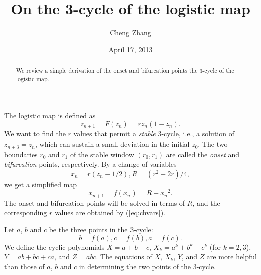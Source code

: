 \documentclass[twocolumn,prl]{revtex4-1}
\begin{document}
\title{On the 3-cycle of the logistic map}
\author{Cheng Zhang}
\date{April 17, 2013}

\begin{abstract}
We review a simple derivation of
  the onset and bifurcation points the 3-cycle
  of the logistic map.
\end{abstract}
\maketitle


The logistic map is defined as
\[
  z_{n+1} = F(z_n) = r z_n (1 - z_n).
\]
We want to find the $r$ values that permit a \emph{stable} 3-cycle,
i.e., a solution of $z_{n+3} = z_n$,
which can sustain a small deviation in the initial $z_0$.
The two boundaries $r_0$ and $r_1$
  of the stable window $(r_0, r_1)$
  are called the \emph{onset} and \emph{bifurcation} points, respectively.
%
By a change of variables
\begin{equation}
  x_n = r (z_n - 1/2),
  R = (r^2 - 2 r)/4,
\label{eq:chvars}
\end{equation}
we get a simplified map
\[
x_{n+1} = f(x_n) = R - {x_n}^2.
\]
The onset and bifurcation points will be solved
  in terms of $R$, and the corresponding $r$ values
  are obtained by (\ref{eq:chvars}).


Let $a$, $b$ and $c$ be the three points in the 3-cycle:
\begin{equation}
  b=f(a), c=f(b), a=f(c).
\label{eq:abc}
\end{equation}
We define the cyclic polynomials
$X = a+b+c$,
$X_k = a^k+b^k+c^k$ (for $k = 2,3$),
$Y = ab+bc+ca$, and $Z = abc$.
The equations of $X$, $X_k$, $Y$, and $Z$
are more helpful than those of $a$, $b$ and $c$
in determining the two points of the 3-cycle.
\end{document}

